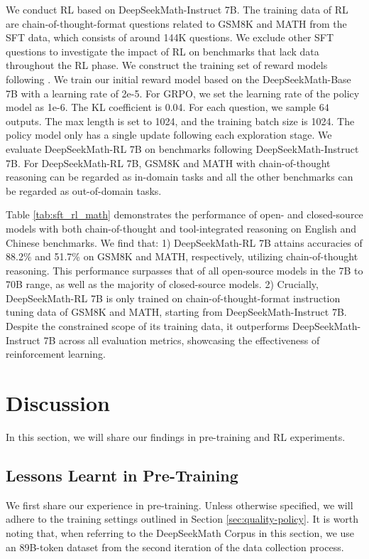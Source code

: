 We conduct RL based on DeepSeekMath-Instruct 7B. The training data of RL are chain-of-thought-format questions related to GSM8K and MATH from the SFT data, which consists of around 144K questions. We exclude other SFT questions to investigate the impact of RL on benchmarks that lack data throughout the RL phase. We construct the training set of reward models following \citep{wang2023math}. We train our initial reward model based on the DeepSeekMath-Base 7B with a learning rate of 2e-5. For GRPO, we set the learning rate of the policy model as 1e-6. The KL coefficient is 0.04. For each question, we sample $64$ outputs.  The max length is set to 1024, and the training batch size is 1024. The policy model only has a single update following each exploration stage. We evaluate DeepSeekMath-RL 7B on benchmarks following DeepSeekMath-Instruct 7B. For DeepSeekMath-RL 7B, GSM8K and MATH with chain-of-thought reasoning can be regarded as in-domain tasks and all the other benchmarks can be regarded as out-of-domain tasks.

Table \ref{tab:sft_rl_math} demonstrates the performance of open- and closed-source models with both chain-of-thought and tool-integrated reasoning on English and Chinese benchmarks. We find that: 1) DeepSeekMath-RL 7B attains accuracies of 88.2\% and 51.7\% on GSM8K and MATH, respectively, utilizing chain-of-thought reasoning. This performance surpasses that of all open-source models in the 7B to 70B range, as well as the majority of closed-source models. 2) Crucially, DeepSeekMath-RL 7B is only trained on chain-of-thought-format instruction tuning data of GSM8K and MATH, starting from DeepSeekMath-Instruct 7B. Despite the constrained scope of its training data, it outperforms DeepSeekMath-Instruct 7B across all evaluation metrics, showcasing the effectiveness of reinforcement learning.

\section{Discussion}
In this section, we will share our findings in pre-training and RL experiments. 

\subsection{Lessons Learnt in Pre-Training}

We first share our experience in pre-training. Unless otherwise specified, we will adhere to the training settings outlined in Section \ref{sec:quality-policy}. It is worth noting that, when referring to the DeepSeekMath Corpus in this section, we use an 89B-token dataset from the second iteration of the data collection process.

